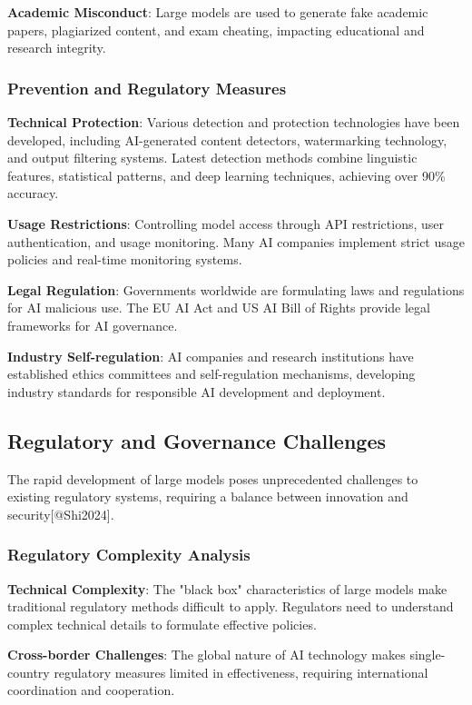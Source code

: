 \documentclass{article}
\begin{document}
\textbf{Academic Misconduct}: Large models are used to generate fake academic papers, plagiarized content, and exam cheating, impacting educational and research integrity.

\subsubsection{Prevention and Regulatory Measures}
\textbf{Technical Protection}: Various detection and protection technologies have been developed, including AI-generated content detectors, watermarking technology, and output filtering systems. Latest detection methods combine linguistic features, statistical patterns, and deep learning techniques, achieving over 90\% accuracy.

\textbf{Usage Restrictions}: Controlling model access through API restrictions, user authentication, and usage monitoring. Many AI companies implement strict usage policies and real-time monitoring systems.

\textbf{Legal Regulation}: Governments worldwide are formulating laws and regulations for AI malicious use. The EU AI Act and US AI Bill of Rights provide legal frameworks for AI governance.

\textbf{Industry Self-regulation}: AI companies and research institutions have established ethics committees and self-regulation mechanisms, developing industry standards for responsible AI development and deployment.

\subsection{Regulatory and Governance Challenges}
The rapid development of large models poses unprecedented challenges to existing regulatory systems, requiring a balance between innovation and security[@Shi2024].

\subsubsection{Regulatory Complexity Analysis}
\textbf{Technical Complexity}: The "black box" characteristics of large models make traditional regulatory methods difficult to apply. Regulators need to understand complex technical details to formulate effective policies.

\textbf{Cross-border Challenges}: The global nature of AI technology makes single-country regulatory measures limited in effectiveness, requiring international coordination and cooperation.
\end{document}
